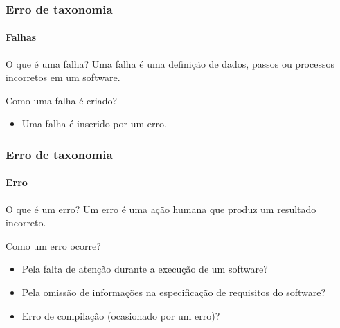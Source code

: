 \begin{frame}[parent={cmap:software-testing-foundations}, hasprev=false, hasnext=true]
\frametitle{Erro de taxonomia}
\framesubtitle{Falhas}
\label{concept:fault}

\begin{block:concept}{O que é uma falha?}
Uma falha é uma definição de dados, passos ou processos incorretos em um software. 
\end{block:concept}

\begin{block:fact}{Como uma falha é criado?}
\begin{itemize}
	\item Uma falha é inserido por um erro.
\end{itemize}
\end{block:fact}

\hfill
{}
\end{frame}



\begin{frame}[hasprev=true, hasnext=true]
\label{concept:mistake}
\frametitle{Erro de taxonomia}
\framesubtitle{Erro}

\begin{block:concept}{O que é um erro?}
Um erro é uma ação humana que produz um resultado incorreto.
\end{block:concept}

\begin{block:fact}{Como um erro ocorre?}
\begin{itemize}
	\item Pela falta de atenção durante a execução de um software?

	\item Pela omissão de informações na especificação de requisitos do software?

	\item Erro de compilação (ocasionado por um erro)?
\end{itemize}
\end{block:fact}

\hfill
{}
\end{frame}



